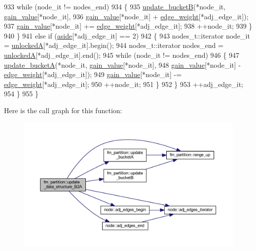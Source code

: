 \begin{DoxyCode}
933         \textcolor{keywordflow}{while} (node\_it != nodes\_end)
934         \{
935         \mbox{\hyperlink{classfm__partition_a270d469ca584ed9adff9fced67743679}{update\_bucketB}}(*node\_it, \mbox{\hyperlink{classfm__partition_ae8176f4ce82305abfd58e519d2cdd91d}{gain\_value}}[*node\_it],
936             \mbox{\hyperlink{classfm__partition_ae8176f4ce82305abfd58e519d2cdd91d}{gain\_value}}[*node\_it] + \mbox{\hyperlink{classfm__partition_adfe6147ba3f9c785f613b472f950595f}{edge\_weight}}[*adj\_edge\_it]);
937         \mbox{\hyperlink{classfm__partition_ae8176f4ce82305abfd58e519d2cdd91d}{gain\_value}}[*node\_it] += \mbox{\hyperlink{classfm__partition_adfe6147ba3f9c785f613b472f950595f}{edge\_weight}}[*adj\_edge\_it];
938         ++node\_it;
939         \}
940     \}
941     \textcolor{keywordflow}{else} \textcolor{keywordflow}{if} (\mbox{\hyperlink{classfm__partition_a14b0aa9a91a6e7fa3035669cf5056275}{aside}}[*adj\_edge\_it] == 2)
942     \{
943         nodes\_t::iterator node\_it = \mbox{\hyperlink{classfm__partition_a9d75a1d63f711a0c66ae7f5bc181cd8b}{unlockedA}}[*adj\_edge\_it].begin();
944         nodes\_t::iterator nodes\_end = \mbox{\hyperlink{classfm__partition_a9d75a1d63f711a0c66ae7f5bc181cd8b}{unlockedA}}[*adj\_edge\_it].end();
945         \textcolor{keywordflow}{while} (node\_it != nodes\_end)
946         \{
947         \mbox{\hyperlink{classfm__partition_aa4ec83c52916cc6cac23e7a9987427cd}{update\_bucketA}}(*node\_it, \mbox{\hyperlink{classfm__partition_ae8176f4ce82305abfd58e519d2cdd91d}{gain\_value}}[*node\_it],
948             \mbox{\hyperlink{classfm__partition_ae8176f4ce82305abfd58e519d2cdd91d}{gain\_value}}[*node\_it] - \mbox{\hyperlink{classfm__partition_adfe6147ba3f9c785f613b472f950595f}{edge\_weight}}[*adj\_edge\_it]);
949         \mbox{\hyperlink{classfm__partition_ae8176f4ce82305abfd58e519d2cdd91d}{gain\_value}}[*node\_it] -= \mbox{\hyperlink{classfm__partition_adfe6147ba3f9c785f613b472f950595f}{edge\_weight}}[*adj\_edge\_it];
950         ++node\_it;
951         \}
952     \}
953     ++adj\_edge\_it;
954     \}
955 \}
\end{DoxyCode}
Here is the call graph for this function\+:\nopagebreak
\begin{figure}[H]
\begin{center}
\leavevmode
\includegraphics[width=350pt]{classfm__partition_a783174f29d49e7e1ae7f6cf71faa82fb_cgraph}
\end{center}
\end{figure}
